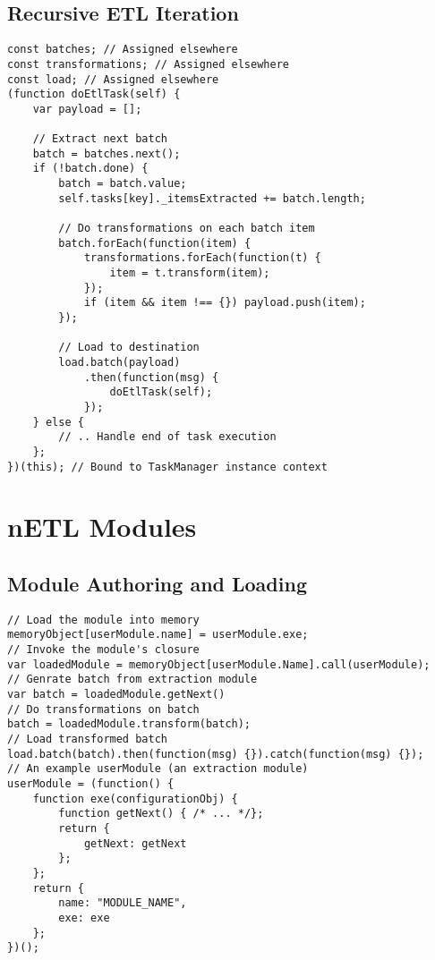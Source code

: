 \subsection{Recursive ETL Iteration}
\label{netl-recursive-iterator}
\begin{verbatim}
const batches; // Assigned elsewhere
const transformations; // Assigned elsewhere
const load; // Assigned elsewhere
(function doEtlTask(self) {
    var payload = [];

    // Extract next batch
    batch = batches.next();
    if (!batch.done) {
        batch = batch.value;
        self.tasks[key]._itemsExtracted += batch.length;
        
        // Do transformations on each batch item
        batch.forEach(function(item) {
            transformations.forEach(function(t) {
                item = t.transform(item);
            });
            if (item && item !== {}) payload.push(item);
        });

        // Load to destination
        load.batch(payload)
            .then(function(msg) {
                doEtlTask(self);
            });
    } else {
        // .. Handle end of task execution
    };
})(this); // Bound to TaskManager instance context
\end{verbatim}

\section{nETL Modules}
\label{netl-modules}

\subsection{Module Authoring and Loading}
\label{netl-module-loading}
\begin{verbatim}
// Load the module into memory
memoryObject[userModule.name] = userModule.exe;
// Invoke the module's closure
var loadedModule = memoryObject[userModule.Name].call(userModule);
// Genrate batch from extraction module
var batch = loadedModule.getNext()
// Do transformations on batch
batch = loadedModule.transform(batch);
// Load transformed batch
load.batch(batch).then(function(msg) {}).catch(function(msg) {});
// An example userModule (an extraction module)
userModule = (function() {
    function exe(configurationObj) {
        function getNext() { /* ... */};
        return {
            getNext: getNext
        };
    };
    return {
        name: "MODULE_NAME",
        exe: exe
    };
})();
\end{verbatim}


